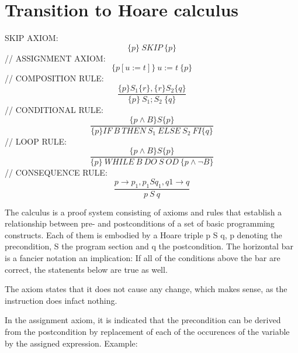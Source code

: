 \section{Transition to Hoare calculus}
SKIP AXIOM:
	\begin{equation}
		\{p\}\ SKIP\ \{p\}
	\end{equation}
//
ASSIGNMENT AXIOM:
	\begin{equation}
		\{p[u:=t]\}\ u:=t\ \{p\}
	\end{equation}
//
COMPOSITION RULE:
	\begin{equation}
		\dfrac{\{p\}S_1\{r\},\{r\}S_2\{q\}}{\{p\}\ S_1;S_2\ \{q\}}
	\end{equation}
//
CONDITIONAL RULE:
	\begin{equation}
		\dfrac{\{p\wedge B\} S \{p\}}{\{p\} IF\ B\ THEN\ S_1\ ELSE\ S_2\ FI\{q\}}
	\end{equation}
//
LOOP RULE:
	\begin{equation}
		\dfrac{\{p \wedge B\}S\{p\}}{\{p\}\ WHILE\ B\ DO\ S\ OD\ \{p \wedge \neg B\}}
	\end{equation}
//
CONSEQUENCE RULE:
	\begin{equation}
		\dfrac{p \to p_1,{p_1}S{q_1},q1 \to q}{{p}\ S\ {q}}
	\end{equation}

The  calculus is a proof system consisting of axioms and rules that establish a relationship between pre- and postconditions of a set of basic programming constructs. Each of them is embodied by a Hoare triple {p} S {q}, p denoting the precondition, S the program section and q the postcondition. The horizontal bar is a fancier notation an implication: If all of the conditions above the bar are correct, the statenents below are true as well.

The  axiom states that it does not cause any change, which makes sense, as the instruction does infact nothing.

In the assignment axiom, it is indicated that the precondition can be derived from the postcondition by replacement of each of the occurences of the variable by the assigned expression. Example:

%

